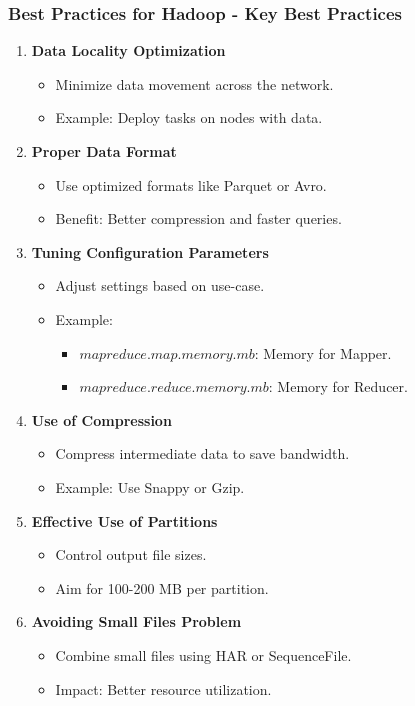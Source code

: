 \documentclass[aspectratio=169]{beamer}
\begin{document}
\begin{frame}[fragile]
    \frametitle{Best Practices for Hadoop - Key Best Practices}
    \begin{enumerate}
        \item \textbf{Data Locality Optimization}
        \begin{itemize}
            \item Minimize data movement across the network.
            \item Example: Deploy tasks on nodes with data.
        \end{itemize}
        
        \item \textbf{Proper Data Format}
        \begin{itemize}
            \item Use optimized formats like Parquet or Avro.
            \item Benefit: Better compression and faster queries.
        \end{itemize}
        
        \item \textbf{Tuning Configuration Parameters}
        \begin{itemize}
            \item Adjust settings based on use-case.
            \item Example: 
            \begin{itemize}
                \item $mapreduce.map.memory.mb$: Memory for Mapper.
                \item $mapreduce.reduce.memory.mb$: Memory for Reducer.
            \end{itemize}
        \end{itemize}
        
        \item \textbf{Use of Compression}
        \begin{itemize}
            \item Compress intermediate data to save bandwidth.
            \item Example: Use Snappy or Gzip.
        \end{itemize}
        
        \item \textbf{Effective Use of Partitions}
        \begin{itemize}
            \item Control output file sizes.
            \item Aim for 100-200 MB per partition.
        \end{itemize}
        
        \item \textbf{Avoiding Small Files Problem}
        \begin{itemize}
            \item Combine small files using HAR or SequenceFile.
            \item Impact: Better resource utilization.
        \end{itemize}
    \end{enumerate}
\end{frame}
\end{document}
